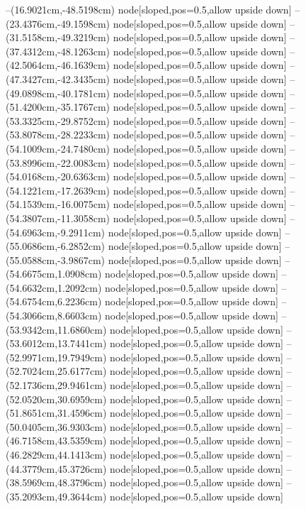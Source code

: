 --(16.9021cm,-48.5198cm) node[sloped,pos=0.5,allow upside down]{\ArrowIn}
--(23.4376cm,-49.1598cm) node[sloped,pos=0.5,allow upside down]{\ArrowIn}
--(31.5158cm,-49.3219cm) node[sloped,pos=0.5,allow upside down]{\ArrowIn}
--(37.4312cm,-48.1263cm) node[sloped,pos=0.5,allow upside down]{\ArrowIn}
--(42.5064cm,-46.1639cm) node[sloped,pos=0.5,allow upside down]{\ArrowIn}
--(47.3427cm,-42.3435cm) node[sloped,pos=0.5,allow upside down]{\ArrowIn}
--(49.0898cm,-40.1781cm) node[sloped,pos=0.5,allow upside down]{\ArrowIn}
--(51.4200cm,-35.1767cm) node[sloped,pos=0.5,allow upside down]{\ArrowIn}
--(53.3325cm,-29.8752cm) node[sloped,pos=0.5,allow upside down]{\ArrowIn}
--(53.8078cm,-28.2233cm) node[sloped,pos=0.5,allow upside down]{\ArrowIn}
--(54.1009cm,-24.7480cm) node[sloped,pos=0.5,allow upside down]{\ArrowIn}
--(53.8996cm,-22.0083cm) node[sloped,pos=0.5,allow upside down]{\ArrowIn}
--(54.0168cm,-20.6363cm) node[sloped,pos=0.5,allow upside down]{\ArrowIn}
--(54.1221cm,-17.2639cm) node[sloped,pos=0.5,allow upside down]{\ArrowIn}
--(54.1539cm,-16.0075cm) node[sloped,pos=0.5,allow upside down]{\ArrowIn}
--(54.3807cm,-11.3058cm) node[sloped,pos=0.5,allow upside down]{\ArrowIn}
--(54.6963cm,-9.2911cm) node[sloped,pos=0.5,allow upside down]{\ArrowIn}
--(55.0686cm,-6.2852cm) node[sloped,pos=0.5,allow upside down]{\ArrowIn}
--(55.0588cm,-3.9867cm) node[sloped,pos=0.5,allow upside down]{\ArrowIn}
--(54.6675cm,1.0908cm) node[sloped,pos=0.5,allow upside down]{\ArrowIn}
--(54.6632cm,1.2092cm) node[sloped,pos=0.5,allow upside down]{\arrowIn}
--(54.6754cm,6.2236cm) node[sloped,pos=0.5,allow upside down]{\ArrowIn}
--(54.3066cm,8.6603cm) node[sloped,pos=0.5,allow upside down]{\ArrowIn}
--(53.9342cm,11.6860cm) node[sloped,pos=0.5,allow upside down]{\ArrowIn}
--(53.6012cm,13.7441cm) node[sloped,pos=0.5,allow upside down]{\ArrowIn}
--(52.9971cm,19.7949cm) node[sloped,pos=0.5,allow upside down]{\ArrowIn}
--(52.7024cm,25.6177cm) node[sloped,pos=0.5,allow upside down]{\ArrowIn}
--(52.1736cm,29.9461cm) node[sloped,pos=0.5,allow upside down]{\ArrowIn}
--(52.0520cm,30.6959cm) node[sloped,pos=0.5,allow upside down]{\arrowIn}
--(51.8651cm,31.4596cm) node[sloped,pos=0.5,allow upside down]{\arrowIn}
--(50.0405cm,36.9303cm) node[sloped,pos=0.5,allow upside down]{\ArrowIn}
--(46.7158cm,43.5359cm) node[sloped,pos=0.5,allow upside down]{\ArrowIn}
--(46.2829cm,44.1413cm) node[sloped,pos=0.5,allow upside down]{\arrowIn}
--(44.3779cm,45.3726cm) node[sloped,pos=0.5,allow upside down]{\ArrowIn}
--(38.5969cm,48.3796cm) node[sloped,pos=0.5,allow upside down]{\ArrowIn}
--(35.2093cm,49.3644cm) node[sloped,pos=0.5,allow upside down]{\ArrowIn}
